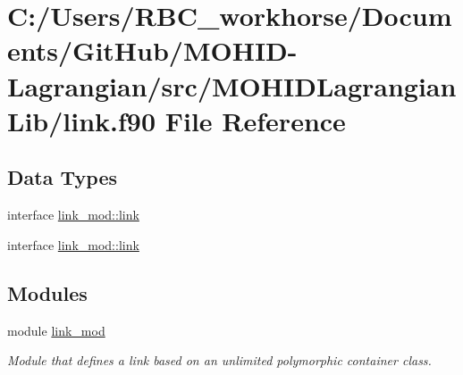 \hypertarget{link_8f90}{}\section{C\+:/\+Users/\+R\+B\+C\+\_\+workhorse/\+Documents/\+Git\+Hub/\+M\+O\+H\+I\+D-\/\+Lagrangian/src/\+M\+O\+H\+I\+D\+Lagrangian\+Lib/link.f90 File Reference}
\label{link_8f90}
\subsection*{Data Types}
\begin{DoxyCompactItemize}
\item 
interface \mbox{\hyperlink{structlink__mod_1_1link}{link\+\_\+mod\+::link}}
\item 
interface \mbox{\hyperlink{structlink__mod_1_1link}{link\+\_\+mod\+::link}}
\end{DoxyCompactItemize}
\subsection*{Modules}
\begin{DoxyCompactItemize}
\item 
module \mbox{\hyperlink{namespacelink__mod}{link\+\_\+mod}}
\begin{DoxyCompactList}\small\item\em Module that defines a link based on an unlimited polymorphic container class. \end{DoxyCompactList}\end{DoxyCompactItemize}
